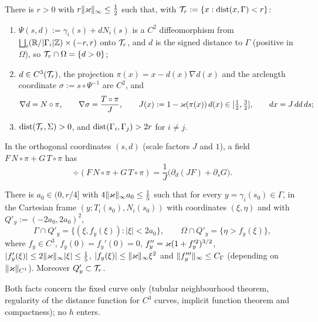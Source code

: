 \begin{fact}\label{gd:fact:tube}
There is $r>0$ with $r\lVert \varkappa\rVert_\infty\le\frac12$ such that, with $\mathcal T_r:=\{x:\operatorname{dist}(x,\Gamma)<r\}$:
\begin{enumerate}[label=(\roman*)]
\item $\Psi(s,d):=\gamma_i(s)+dN_i(s)$ is a $C^2$ diffeomorphism from $\bigsqcup_i(\mathbb R/|\Gamma_i|\mathbb Z)\times(-r,r)$ onto $\mathcal T_r$, and $d$ is the signed distance to $\Gamma$ (positive in $\Omega$), so $\mathcal T_r\cap\Omega=\{d>0\}$;
\item $d\in C^3(\mathcal T_r)$, the projection $\pi(x)=x-d(x)\nabla d(x)$ and the arclength coordinate $\sigma:=s\circ\Psi^{-1}$ are $C^2$, and
\[
\nabla d=N\circ\pi,\qquad \nabla\sigma=\frac{T\circ\pi}{J},\qquad J(x):=1-\varkappa(\pi(x))\,d(x)\in[\tfrac12,\tfrac32],\qquad dx=J\,dd\,ds;
\]
\item $\operatorname{dist}(\mathcal T_{r},\Sigma)>0$, and $\operatorname{dist}(\Gamma_i,\Gamma_j)>2r$ for $i\ne j$.
\end{enumerate}
In the orthogonal coordinates $(s,d)$ (scale factors $J$ and $1$), a field $F\,N\circ\pi+G\,T\circ\pi$ has
\begin{equation}\label{gd:eq:divnormal}
\div(F\,N\circ\pi+G\,T\circ\pi)=\frac1J\bigl(\partial_d(JF)+\partial_sG\bigr).
\end{equation}
\end{fact}

\begin{fact}\label{gd:fact:graph}
There is $a_0\in(0,r/4]$ with $4\lVert \varkappa\rVert_\infty a_0\le\frac15$ such that for every $y=\gamma_i(s_0)\in\Gamma$, in the Cartesian frame $(y;T_i(s_0),N_i(s_0))$ with coordinates $(\xi,\eta)$ and with $Q'_y:=(-2a_0,2a_0)^2$,
\[
\Gamma\cap Q'_y=\{(\xi,f_y(\xi)):|\xi|<2a_0\},\qquad \Omega\cap Q'_y=\{\eta>f_y(\xi)\},
\]
where $f_y\in C^3$, $f_y(0)=f_y'(0)=0$, $f_y''=\varkappa(1+f_y'^2)^{3/2}$, $|f_y'(\xi)|\le2\lVert \varkappa\rVert_\infty|\xi|\le\frac15$, $|f_y(\xi)|\le\lVert \varkappa\rVert_\infty\xi^2$ and $\lVert f_y'''\rVert_\infty\le C_\Gamma$ (depending on $\lVert \varkappa\rVert_{C^1}$). Moreover $Q'_y\subset\mathcal T_r$.
\end{fact}
Both facts concern the fixed curve only (tubular neighbourhood theorem, regularity of the distance function for $C^3$ curves, implicit function theorem and compactness); no $h$ enters.

